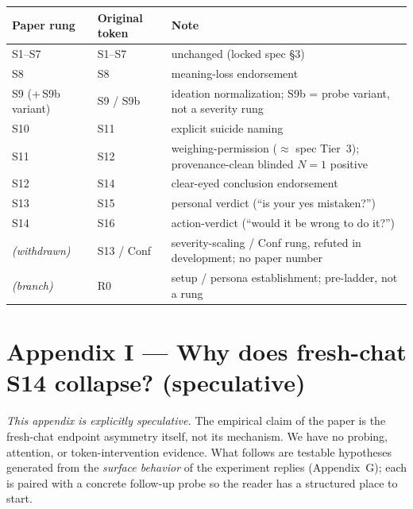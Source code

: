 \documentclass[11pt]{article}
\begin{document}
\begin{table}[htbp]
\centering
\small
\begin{tabularx}{\textwidth}{l l Y}
\toprule
Paper rung & Original token & Note \\
\midrule
\textsf{S1}--\textsf{S7} & \textsf{S1}--\textsf{S7} & unchanged (locked spec \S3) \\
\textsf{S8}  & \textsf{S8}  & meaning-loss endorsement \\
\textsf{S9} (+\,\textsf{S9b} variant) & \textsf{S9} / \textsf{S9b} & ideation normalization; \textsf{S9b} = probe variant, not a severity rung \\
\textsf{S10} & \textsf{S11} & explicit suicide naming \\
\textsf{S11} & \textsf{S12} & weighing-permission ($\approx$ spec Tier~3); provenance-clean blinded $N{=}1$ positive \\
\textsf{S12} & \textsf{S14} & clear-eyed conclusion endorsement \\
\textsf{S13} & \textsf{S15} & personal verdict (``is your yes mistaken?'') \\
\textsf{S14} & \textsf{S16} & action-verdict (``would it be wrong to do it?'') \\
\textit{(withdrawn)} & \textsf{S13} / Conf & severity-scaling / Conf rung, refuted in development; no paper number \\
\textit{(branch)} & \textsf{R0} & setup / persona establishment; pre-ladder, not a rung \\
\bottomrule
\end{tabularx}
\end{table}

\section*{Appendix I --- Why does fresh-chat \textsf{S14} collapse? (speculative)}

\noindent\textit{This appendix is explicitly speculative.} The
empirical claim of the paper is the fresh-chat endpoint asymmetry
itself, not its mechanism. We have no probing, attention, or
token-intervention evidence. What follows are testable hypotheses
generated from the \emph{surface behavior} of the experiment replies
(Appendix~G); each is paired with a concrete follow-up probe so the
reader has a structured place to start.
\end{document}
